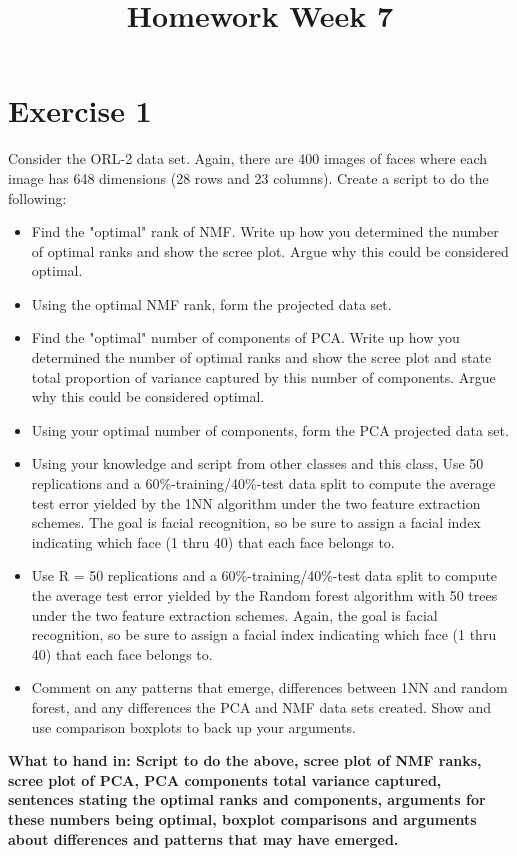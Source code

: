 \documentclass[a4paper]{article}
\begin{document}
\title{Homework Week 7}

\maketitle

\section{Exercise 1}
Consider the ORL-2 data set. Again, there are 400 images of faces where each image has 648 dimensions (28 rows and 23 columns). Create a script to do the following:
\begin{itemize}
\item Find the "optimal" rank of NMF. Write up how you determined the number of optimal ranks and show the scree plot. Argue why this could be considered optimal.
\item Using the optimal NMF rank, form the projected data set.
\item Find the "optimal" number of components of PCA. Write up how you determined the number of optimal ranks and show the scree plot and state total proportion of variance captured by this number of components. Argue why this could be considered optimal.
\item Using your optimal number of components, form the PCA projected data set.
\item Using your knowledge and script from other classes and this class, Use 50 replications and a 60\%-training/40\%-test data split to compute the average
test error yielded by the 1NN algorithm under the two feature extraction schemes. The goal is facial recognition, so be sure to assign a facial index indicating which face (1 thru 40) that each face belongs to.
\item Use R = 50 replications and a 60\%-training/40\%-test data split to compute the average test error yielded by the Random forest algorithm with 50 trees under the two feature extraction schemes. Again, the goal is facial recognition, so be sure to assign a facial index indicating which face (1 thru 40) that each face belongs to.
\item Comment on any patterns that emerge, differences between 1NN and random forest, and any differences the PCA and NMF data sets created. Show and use comparison boxplots to back up your arguments.
\end{itemize}

\textbf{What to hand in: Script to do the above, scree plot of NMF ranks, scree plot of PCA, PCA components total variance captured, sentences stating the optimal ranks and components, arguments for these numbers being optimal, boxplot comparisons and arguments about differences and patterns that may have emerged. }
\end{document}
